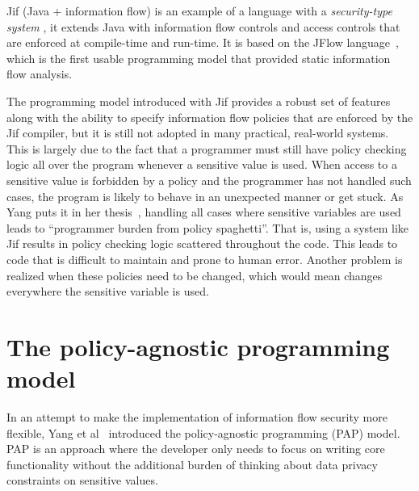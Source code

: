 Jif (Java + information flow) is an example of a language with a \textit{security-type system}
\cite{jifurl}, it extends Java with information flow controls and access controls
that are enforced at compile-time and run-time. It is based on the JFlow
language~\cite{Jflow}, which is the first usable programming model that provided
static information flow analysis.

The programming model introduced with Jif provides a robust set of features along
with the ability to specify information flow policies that are enforced by the Jif
compiler, but it is still not adopted in many practical, real-world systems. This
is largely due to the fact that a programmer must still have policy checking logic
all over the program whenever a sensitive value is used. When access to a sensitive
value is forbidden by a policy and the programmer has not handled such cases, the
program is likely to behave in an unexpected manner or get stuck. As Yang puts it
in her thesis~\cite{YangPhd}, handling all cases where sensitive variables are used
leads to ``programmer burden from policy spaghetti''. That is, using a system like
Jif results in policy checking logic scattered throughout the code. This leads to
code that is difficult to maintain and prone to human error. Another problem is
realized when these policies need to be changed, which would mean changes everywhere
the sensitive variable is used.

\section{The policy-agnostic programming model \label{sec:PAPModel}}
In an attempt to make the implementation of information flow security more flexible,
Yang et al~\cite{Jeeves} introduced the policy-agnostic programming (PAP) model.
PAP is an approach where the developer only needs to focus on writing core functionality
without the additional burden of thinking about data privacy constraints on sensitive
values.

